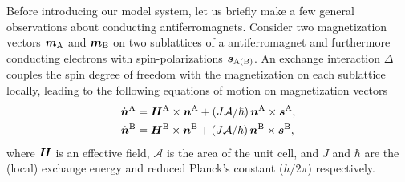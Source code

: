 Before introducing our model system, let us briefly make a few general observations about conducting antiferromagnets. Consider two magnetization vectors $\boldsymbol{m}_\text{A}$ and $\boldsymbol{m}_\text{B}$ on two sublattices of a antiferromagnet and furthermore conducting electrons with spin-polarizations $\boldsymbol{s}_\text{A(B)}$. An exchange interaction $\Delta$ couples the spin degree of freedom with the magnetization on each sublattice locally, leading to the following equations of motion on magnetization vectors
\beml
\label{basicEQ}
\begin{align}
\dot{\boldsymbol{n}}^\textrm{A}  & = \boldsymbol{H}^\textrm{A}\times\boldsymbol{n}^\textrm{A}  + (J\mathcal{A}/\hbar)\,\boldsymbol{n}^\textrm{A}\times \boldsymbol{s}^\textrm{A},\\
\dot{\boldsymbol{n}}^\textrm{B} & = \boldsymbol{H}^\textrm{B}\times\boldsymbol{n}^\textrm{B} +(J\mathcal{A}/\hbar)\,\boldsymbol{n}^\textrm{B}\times \boldsymbol{s}^\textrm{B},
\end{align}
\eml
where $\boldsymbol{H}$ is an effective field, $\mathcal{A}$ is the area of the unit cell, and $J$ and $\hbar$ are the (local) exchange energy and reduced Planck's constant ($h/2\pi$) respectively. 

